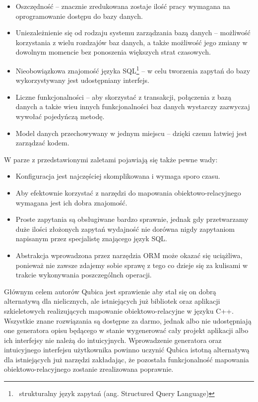 \documentclass[12pt]{report}
\begin{document}
\begin{itemize}
\item Oszczędność -- znacznie zredukowana zostaje ilość pracy wymagana na oprogramowanie dostępu do bazy danych.
\item Uniezależnienie się od rodzaju systemu zarządzania bazą danych -- możliwość korzystania z wielu rozdzajów baz danych, a także możliwość jego zmiany w dowolnym
momencie bez ponoszenia większych strat czasowych.
\item Nieobowiązkowa znajomość języka SQL\footnote{~strukturalny język zapytań (ang. Structured Query Language)} -- w celu tworzenia zapytań do bazy wykorzystywany
jest udostępniany interfejs.
\item Liczne funkcjonalności -- aby skorzystać z transakcji, połączenia z bazą danych a także wieu innych funkcjonalności baz danych wystarczy zazwyczaj wywołać
pojedyńczą metodę.
\item Model danych przechowywany w jednym miejscu -- dzięki czemu łatwiej jest zarządzać kodem.
\end{itemize}

W parze z przedstawionymi zaletami pojawiają się także pewne wady:

\begin{itemize}
\item Konfiguracja jest najczęściej skomplikowana i wymaga sporo czasu.
\item Aby efektownie korzystać z narzędzi do mapowania obiektowo-relacyjnego wymagana jest ich dobra znajomość.
\item Proste zapytania są obsługiwane bardzo sprawnie, jednak gdy przetwarzamy duże ilości złożonych zapytań wydajność nie dorówna nigdy zapytaniom na\-pi\-sa\-nym
przez specjalistę znającego język SQL.
\item Abstrakcja wprowadzona przez narzędzia ORM może okazać się uciążliwa, ponieważ nie zawsze zdajemy sobie sprawę z tego co dzieje się za kulisami w trakcie
wykonywania poszczególnch operacji.
\end{itemize}

Głównym celem autorów Qubica jest sprawienie aby stał się on dobrą alterna\-tywą dla nielicznych, ale istniejących już bibliotek oraz aplikacji szkieletowych realizujących
mapowanie obiektowo-relacyjne w języku C++. Wszystkie znane rozwiązania są dostępne za darmo, jednak albo nie udostępniają one generatora opisu będącego w stanie 
wygenerować cały projekt aplikacji albo ich interfejsy nie należą do intuicyjnych. Wprowadzenie generatora oraz intuicyjnego interfejsu użytkownika powinno uczynić Qubica
istotną alternatywą dla istniejących już narzędzi za\-kła\-da\-jąc, że pozostała funkcjonalność mapowania obiektowo-relacyjnego zostanie zre\-al\-iz\-owana poprawnie.
\end{document}

